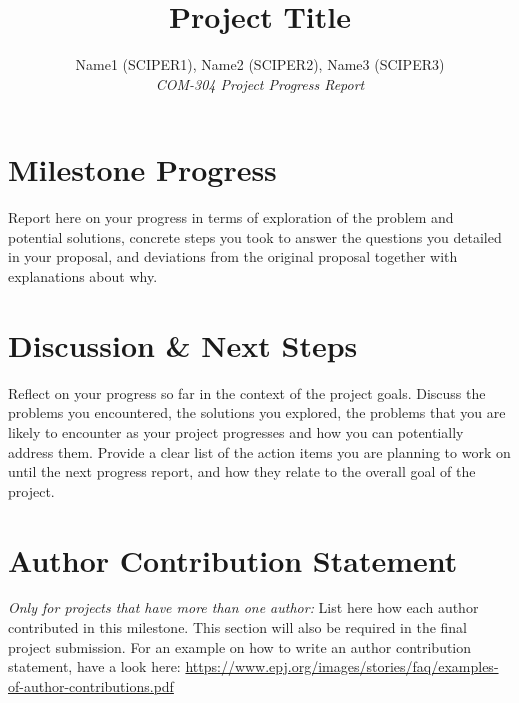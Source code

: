 \documentclass[10pt,conference,compsocconf]{IEEEtran}
\begin{document}
\title{Project Title}

\author{
  Name1 (SCIPER1), Name2 (SCIPER2), Name3 (SCIPER3)\\
  \textit{COM-304 Project Progress Report}
}

\maketitle


\section{Milestone Progress}
Report here on your progress in terms of exploration of the problem and potential solutions, concrete steps you took to answer the questions you detailed in your proposal, and deviations from the original proposal together with explanations about why.


\section{Discussion \& Next Steps}
Reflect on your progress so far in the context of the project goals. Discuss the problems you encountered, the solutions you explored, the problems that you are likely to encounter as your project progresses and how you can potentially address them. Provide a clear list of the action items you are planning to work on until the next progress report, and how they relate to the overall goal of the project.



\section{Author Contribution Statement}
\textit{Only for projects that have more than one author:}
List here how each author contributed in this milestone. This section will also be required in the final project submission. For an example on how to write an author contribution statement, have a look here: \url{https://www.epj.org/images/stories/faq/examples-of-author-contributions.pdf}


%
%
\end{document}

